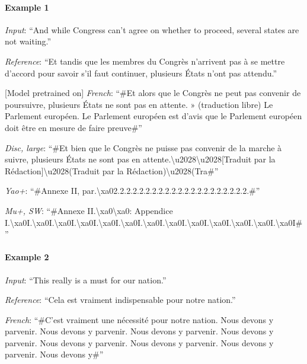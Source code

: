 \paragraph{Example 1}
\emph{Input}: ``And while Congress can't agree on whether to proceed, several states are not waiting.''

\emph{Reference}: ``Et tandis que les membres du Congrès n'arrivent pas à se mettre d'accord pour savoir s'il faut continuer, plusieurs États n'ont pas attendu.''

[Model pretrained on] \emph{French}:
``\#Et alors que le Congrès ne peut pas convenir de poursuivre, plusieurs États ne sont pas en attente. » (traduction libre) Le Parlement européen. Le Parlement européen est d’avis que le Parlement européen doit être en mesure de faire preuve\#''

\emph{Disc, large}:
``\#Et bien que le Congrès ne puisse pas convenir de la marche à suivre, plusieurs États ne sont pas en attente.\textbackslash{}u2028\textbackslash{}u2028[Traduit par la Rédaction]\textbackslash{}u2028(Traduit par la Rédaction)\textbackslash{}u2028(Tra\#''

\emph{Yao+}:
``\#Annexe II, par.\allowbreak{}\textbackslash{}xa02.\allowbreak{}2.\allowbreak{}2.\allowbreak{}2.\allowbreak{}2.\allowbreak{}2.\allowbreak{}2.\allowbreak{}2.\allowbreak{}2.\allowbreak{}2.\allowbreak{}2.\allowbreak{}2.\allowbreak{}2.\allowbreak{}2.\allowbreak{}2.\allowbreak{}2.\allowbreak{}2.\allowbreak{}2.\allowbreak{}2.\allowbreak{}2.\allowbreak{}2.\allowbreak{}\#''

\emph{Mu+, SW}:
``\#Annexe II.\allowbreak{}\textbackslash{}xa0\allowbreak{}\textbackslash{}xa0: Appendice I.\allowbreak{}\textbackslash{}xa0I.\allowbreak{}\textbackslash{}xa0I.\allowbreak{}\textbackslash{}xa0I.\allowbreak{}\textbackslash{}xa0I.\allowbreak{}\textbackslash{}xa0I.\allowbreak{}\textbackslash{}xa0I.\allowbreak{}\textbackslash{}xa0I.\allowbreak{}\textbackslash{}xa0I.\allowbreak{}\textbackslash{}xa0I.\allowbreak{}\textbackslash{}xa0I.\allowbreak{}\textbackslash{}xa0I.\allowbreak{}\textbackslash{}xa0I.\allowbreak{}\textbackslash{}xa0I\#''

\paragraph{Example 2}
\emph{Input}:
``This really is a must for our nation.''

\emph{Reference}:
``Cela est vraiment indispensable pour notre nation.''

\emph{French}:
``\#C'est vraiment une nécessité pour notre nation. Nous devons y parvenir. Nous devons y parvenir. Nous devons y parvenir. Nous devons y parvenir. Nous devons y parvenir. Nous devons y parvenir. Nous devons y parvenir. Nous devons y\#''

